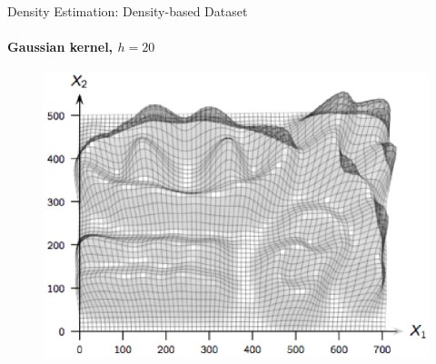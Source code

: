 \begin{frame}{Density Estimation: Density-based Dataset}
  \framesubtitle{Gaussian kernel, $h=20$}
\begin{figure}
    \includegraphics[scale=0.6]{CLUST/density/figs/draftfigs/kdeShape.eps}
\end{figure}
\end{frame}




